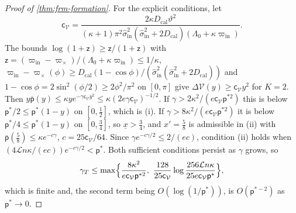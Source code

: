 \begin{proof}[Proof of \cref{thm:frm-formation}]
For the explicit conditions, let
\begin{equation*}
\mathsf c_{\mathcal V}=\frac{2\kappa D_{\mathrm{cal}}\vartheta^2}{(\kappa+1)\pi^2\hat\sigma^2_{\mathrm{in}}(\hat\sigma^2_{\mathrm{in}}+2D_{\mathrm{cal}})(\Lambda_0+\kappa\varpi_{\mathrm{in}})}.
\end{equation*}
The bounds $\log(1+\mathsf z)\ge\mathsf z/(1+\mathsf z)$ with $\mathsf z=(\varpi_{\mathrm{in}}-\varpi_\times)/(\Lambda_0+\kappa\varpi_{\mathrm{in}})\le1/\kappa$, $\varpi_{\mathrm{in}}-\varpi_\times(\phi)\ge D_{\mathrm{cal}}(1-\cos\phi)/(\hat\sigma^2_{\mathrm{in}}(\hat\sigma^2_{\mathrm{in}}+2D_{\mathrm{cal}}))$ and $1-\cos\phi=2\sin^2(\phi/2)\ge2\phi^2/\pi^2$ on $[0,\pi]$ give $\Delta\mathcal V(y)\ge\mathsf c_{\mathcal V} y^2$ for $K=2$. Then $y\bar{\mathsf p}(y)\le\kappa ye^{-\gamma\mathsf c_{\mathcal V} y^2}\le\kappa(2e\gamma\mathsf c_{\mathcal V})^{-1/2}$. If $\gamma>2\kappa^2/(e\mathsf c_{\mathcal V}\mathsf p^{\ast2})$ this is below $\mathsf p^\ast/2\le\mathsf p^\ast(1-y)$ on $[0,\frac12]$, which is (i). If $\gamma>8\kappa^2/(e\mathsf c_{\mathcal V}\mathsf p^{\ast2})$ it is below $\mathsf p^\ast/4\le\mathsf p^\ast(1-y)$ on $[0,\frac34]$, so $\underline x>\frac34$, and $x'=\frac58$ is admissible in (ii) with $\bar{\mathsf p}(\frac58)\le\kappa e^{-c\gamma}$, $c=25\mathsf c_{\mathcal V}/64$. Since $\gamma e^{-c\gamma/2}\le2/(ec)$, condition (ii) holds when $(4\mathcal Ln\kappa/(ec))e^{-c\gamma/2}<\mathsf p^\ast$. Both sufficient conditions persist as $\gamma$ grows, so
\begin{equation*}
\gamma_T\le\max\Bigl\{\frac{8\kappa^2}{e\mathsf c_{\mathcal V}\mathsf p^{\ast2}},\ \frac{128}{25\mathsf c_{\mathcal V}}\log\frac{256\mathcal Ln\kappa}{25e\mathsf c_{\mathcal V}\mathsf p^\ast}\Bigr\},
\end{equation*}
which is finite and, the second term being $O(\log(1/\mathsf p^\ast))$, is $O(\mathsf p^{\ast-2})$ as $\mathsf p^\ast\to0$.


\end{proof}
